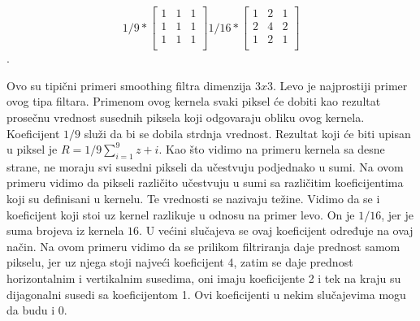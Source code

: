 \documentclass[a4paper,12pt,titlepage]{article}
\begin{document}
\[
1/9
*
\begin{bmatrix}
     1 & 1 & 1 \\
     1 & 1 & 1 \\
     1 & 1 & 1 \\
\end{bmatrix}
1/16
*
\begin{bmatrix}
     1 & 2 & 1 \\
     2 & 4 & 2 \\
     1 & 2 & 1 \\
\end{bmatrix}
\].     

Ovo su tipični primeri smoothing filtra dimenzija $3 x 3$. Levo je najprostiji primer ovog tipa filtara. Primenom ovog kernela svaki piksel će dobiti kao rezultat prosečnu vrednost susednih piksela koji odgovaraju obliku ovog kernela. Koeficijent $1/9$ služi da bi se dobila strdnja vrednost. Rezultat koji će biti upisan u piksel je $R = 1/9 \sum_{i = 1}^{9} z+{i}$. Kao što vidimo na primeru kernela sa desne strane, ne moraju svi susedni pikseli da učestvuju podjednako u sumi. Na ovom primeru vidimo da pikseli različito učestvuju u sumi sa različitim koeficijentima koji su definisani u kernelu. Te vrednosti se nazivaju težine. Vidimo da se i koeficijent koji stoi uz kernel razlikuje u odnosu na primer levo. On je $1/16$, jer je suma brojeva iz kernela $16$. U većini slučajeva se ovaj koeficijent određuje na ovaj način. Na ovom primeru vidimo da se prilikom filtriranja daje prednost samom pikselu, jer uz njega stoji najveći koeficijent 4, zatim se daje prednost horizontalnim i vertikalnim susedima, oni imaju koeficijente 2 i tek na kraju su dijagonalni susedi sa koeficijentom 1. Ovi koeficijenti u nekim slučajevima mogu da budu i 0.
\end{document}
